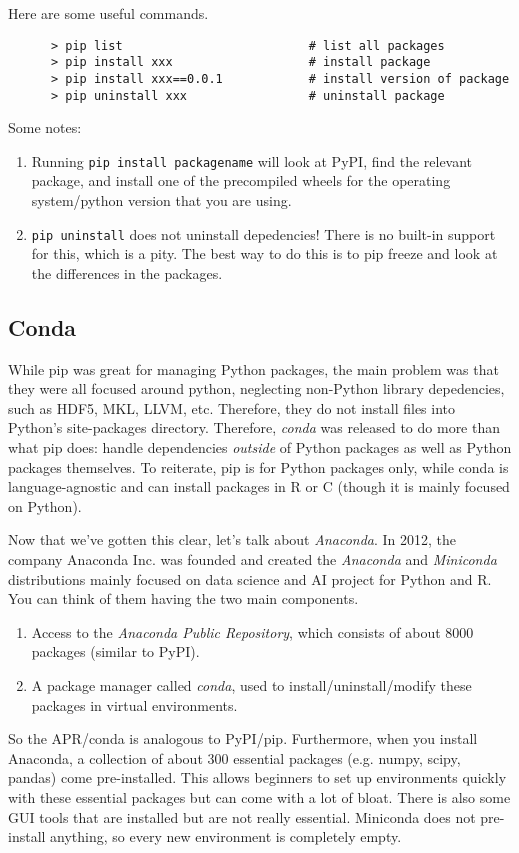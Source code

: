   \begin{example}
    Here are some useful commands. 
    \begin{lstlisting}
      > pip list                          # list all packages  
      > pip install xxx                   # install package
      > pip install xxx==0.0.1            # install version of package 
      > pip uninstall xxx                 # uninstall package
    \end{lstlisting} 
    Some notes: 
    \begin{enumerate}
      \item Running \texttt{pip install packagename} will look at PyPI, find the relevant package, and install one of the precompiled wheels for the operating system/python version that you are using.  
      \item \texttt{pip uninstall} does not uninstall depedencies! There is no built-in support for this, which is a pity. The best way to do this is to pip freeze and look at the differences in the packages. 
    \end{enumerate}
  \end{example}
  
\subsection{Conda}

  While pip was great for managing Python packages, the main problem was that they were all focused around python, neglecting non-Python library depedencies, such as HDF5, MKL, LLVM, etc. Therefore, they do not install files into Python's site-packages directory. Therefore, \textit{conda} was released to do more than what pip does: handle dependencies \textit{outside} of Python packages as well as Python packages themselves. To reiterate, pip is for Python packages only, while conda is language-agnostic and can install packages in R or C (though it is mainly focused on Python). 

  Now that we've gotten this clear, let's talk about \textit{Anaconda}. In 2012, the company Anaconda Inc. was founded and created the \textit{Anaconda} and \textit{Miniconda} distributions mainly focused on data science and AI project for Python and R. You can think of them having the two main components. 
  \begin{enumerate}
    \item Access to the \textit{Anaconda Public Repository}, which consists of about 8000 packages (similar to PyPI). 
    \item A package manager called \textit{conda}, used to install/uninstall/modify these packages in virtual environments. 
  \end{enumerate}
  So the APR/conda is analogous to PyPI/pip. Furthermore, when you install Anaconda, a collection of about 300 essential packages (e.g. numpy, scipy, pandas) come pre-installed. This allows beginners to set up environments quickly with these essential packages but can come with a lot of bloat. There is also some GUI tools that are installed but are not really essential. Miniconda does not pre-install anything, so every new environment is completely empty. 

